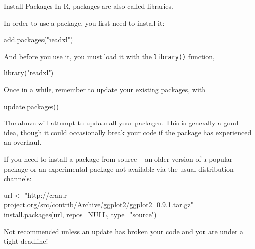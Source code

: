 \documentclass[
  11pt,
  ignorenonframetext,
  svgnames, handout, t]{beamer}
\newenvironment{Shaded}{\begin{snugshade}}{\end{snugshade}}
\newcommand{\AttributeTok}[1]{\textcolor[rgb]{0.77,0.63,0.00}{#1}}
\newcommand{\ConstantTok}[1]{\textcolor[rgb]{0.00,0.00,0.00}{#1}}
\newcommand{\FunctionTok}[1]{\textcolor[rgb]{0.00,0.00,0.00}{#1}}
\newcommand{\NormalTok}[1]{#1}
\newcommand{\OtherTok}[1]{\textcolor[rgb]{0.56,0.35,0.01}{#1}}
\newcommand{\StringTok}[1]{\textcolor[rgb]{0.31,0.60,0.02}{#1}}
\begin{document}
\begin{frame}[fragile]{Install Packages}
\protect\hypertarget{install-packages}{}
In R, packages are also called libraries.

In order to use a package, you first need to install it:

\footnotesize

\begin{Shaded}
\begin{Highlighting}[]
\FunctionTok{add.packages}\NormalTok{(}\StringTok{"readxl"}\NormalTok{)}
\end{Highlighting}
\end{Shaded}

\normalsize

And before you use it, you must load it with the \texttt{library()}
function,

\footnotesize

\begin{Shaded}
\begin{Highlighting}[]
\FunctionTok{library}\NormalTok{(}\StringTok{"readxl"}\NormalTok{)}
\end{Highlighting}
\end{Shaded}

\normalsize

Once in a while, remember to update your existing packages, with

\footnotesize

\begin{Shaded}
\begin{Highlighting}[]
\FunctionTok{update.packages}\NormalTok{()}
\end{Highlighting}
\end{Shaded}

\normalsize The above will attempt to update all your packages. This is
generally a good idea, though it could occasionally break your code if
the package has experienced an overhaul.

If you need to install a package from source -- an older version of a
popular package or an experimental package not available via the usual
distribution channels:

\footnotesize

\begin{Shaded}
\begin{Highlighting}[]
\NormalTok{url }\OtherTok{\textless{}{-}} \StringTok{"http://cran.r{-}project.org/src/contrib/Archive/ggplot2/ggplot2\_0.9.1.tar.gz"}
\FunctionTok{install.packages}\NormalTok{(url, }\AttributeTok{repos=}\ConstantTok{NULL}\NormalTok{, }\AttributeTok{type=}\StringTok{"source"}\NormalTok{)}
\end{Highlighting}
\end{Shaded}

\normalsize Not recommended unless an update has broken your code and
you are under a tight deadline!
\end{frame}
\end{document}
